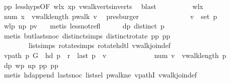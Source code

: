 \begin{isabellebody}
\ pp{\isacharprime}{\isacharparenleft}{}{\isacharparenright}\ less{\isachardot}hyps{\isacharbrackleft}OF\ wlx{\isacharbrackright}\ xp\ vwalk{\isacharunderscore}verts{\isacharunderscore}in{\isacharunderscore}verts\ \isamarkupfalse%
\ blast\isanewline
\ \ \ \ \ \ \ \ \isamarkupfalse%
\ wlx\ \isamarkupfalse%
\ {\isachardoublequoteopen}num\ x\ {\isacharless}\ vwalk{\isacharunderscore}length\ {\isacharparenleft}pwalk\ v{\isacharparenright}{\isachardoublequoteclose}\ \isamarkupfalse%
\ presburger\isanewline
\ \ \ \ \ \ \isacommand{{\isacharbraceright}}\isamarkupfalse%
\isanewline
\ \ \ \ \isamarkupfalse%
\ \isamarkupfalse%
\ {\isachardoublequoteopen}v\ {\isasymnotin}\ set\ {\isacharquery}p{\isacharprime}{\isachardoublequoteclose}\ \isamarkupfalse%
\ wlp\ np\ pv\ \ \isamarkupfalse%
\ {\isacharparenleft}metis\ less{\isacharunderscore}not{\isacharunderscore}refl{\isacharparenright}\isanewline
\ \ \ \ \isamarkupfalse%
\ dp{\isacharcolon}\ {\isachardoublequoteopen}distinct\ p{\isachardoublequoteclose}\ \isanewline
\ \ \ \ \ \ \isamarkupfalse%
\ {\isacharparenleft}metis\ butlast{\isacharunderscore}snoc\ distinct{\isachardot}simps{\isacharparenleft}{}{\isacharparenright}\ distinct{}{\isacharunderscore}rotate\ pp\ pp{\isacharprime}{\isacharparenleft}{}{\isacharparenright}\isanewline
\ \ \ \ \ \ \ \ list{\isachardot}simps{\isacharparenleft}{}{\isacharparenright}\ rotate{}{\isachardot}simps{\isacharparenleft}{}{\isacharparenright}\ rotate{}{\isacharunderscore}hd{\isacharunderscore}tl\ vwalk{\isacharunderscore}join{\isacharunderscore}def{\isacharparenright}\isanewline
\ \ \ \ \isamarkupfalse%
\ {\isachardoublequoteopen}vpath\ p\ G\ {\isasymand}\ hd\ p\ {\isacharequal}\ r\ {\isasymand}\ last\ p\ {\isacharequal}\ v\ {\isasymand}\ \isanewline
\ \ \ \ \ \ \ \ \ \ \ num\ v\ {\isacharequal}\ vwalk{\isacharunderscore}length\ p{\isachardoublequoteclose}\isanewline
\ \ \ \ \ \ \isamarkupfalse%
\ dp\ wp\ np\ pp{\isacharprime}\ pp\ \isanewline
\ \ \ \ \ \ \isamarkupfalse%
\ {\isacharparenleft}metis\ hd{\isacharunderscore}append{}\ last{\isacharunderscore}snoc\ list{\isachardot}sel{\isacharparenleft}{}{\isacharparenright}\ pwalk{\isacharunderscore}ne\ vpathI\ vwalk{\isacharunderscore}join{\isacharunderscore}def{\isacharparenright}\isanewline
\ \ \ \ \isamarkupfalse%

\end{isabellebody}
